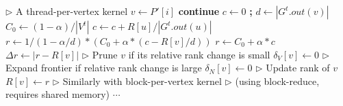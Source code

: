 \begin{algorithm}[!hbt]
\begin{algorithmic}[1]
  \State $\rhd$ A thread-per-vertex kernel
  \ForAll{$i \in [0, N'_P)$ \textbf{in parallel$_{thread/V}$}}
    \State $v \gets P'[i]$
     \textbf{continue}
    \EndIf
      \State $c \gets 0$ \textbf{;} $d \gets |G^t.out(v)|$
      \State $C_0 \gets (1 - \alpha)/|V^t|$
        \State $c \gets c + R[u] / |G^t.out(u)|$
      \EndFor
       \label{alg:frontier--formula-begin}
        \State $r \gets 1/(1 - \alpha/d) * (C_0 + \alpha * (c - R[v]/d))$
      \Else
        \State $r \gets C_0 + \alpha * c$
      \EndIf \label{alg:frontier--formula-end}
      \State $\Delta r \gets |r - R[v]|$
      \State $\rhd$ Prune $v$ if its relative rank change is small
        \State $\delta_V[v] \gets 0$
      \EndIf
      \State $\rhd$ Expand frontier if relative rank change is large
       \label{alg:frontier--remark-begin}
        \State $\delta_N[v] \gets 0$
      \EndIf
      \State $\rhd$ Update rank of $v$
      \State $R[v] \gets r$
  \EndFor
  \State $\rhd$ Similarly with block-per-vertex kernel
  \State $\rhd$ (using block-reduce, requires shared memory)
  \ForAll{$i \in [N'_P, |V^t|)$ \textbf{in parallel$_{block/V}$}}
    \State $\cdots$
  \EndFor
\EndFunction
\end{algorithmic}
\end{algorithm}





